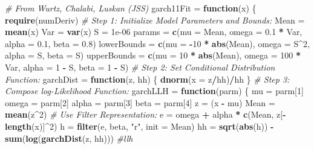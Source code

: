 \documentclass[]{book}
\newenvironment{Shaded}{\begin{snugshade}}{\end{snugshade}}
\newcommand{\KeywordTok}[1]{\textcolor[rgb]{0.13,0.29,0.53}{\textbf{#1}}}
\newcommand{\DataTypeTok}[1]{\textcolor[rgb]{0.13,0.29,0.53}{#1}}
\newcommand{\DecValTok}[1]{\textcolor[rgb]{0.00,0.00,0.81}{#1}}
\newcommand{\FloatTok}[1]{\textcolor[rgb]{0.00,0.00,0.81}{#1}}
\newcommand{\StringTok}[1]{\textcolor[rgb]{0.31,0.60,0.02}{#1}}
\newcommand{\CommentTok}[1]{\textcolor[rgb]{0.56,0.35,0.01}{\textit{#1}}}
\newcommand{\ControlFlowTok}[1]{\textcolor[rgb]{0.13,0.29,0.53}{\textbf{#1}}}
\newcommand{\OperatorTok}[1]{\textcolor[rgb]{0.81,0.36,0.00}{\textbf{#1}}}
\newcommand{\NormalTok}[1]{#1}
\begin{document}
\begin{Shaded}
\begin{Highlighting}[]
\CommentTok{# From Wurtz, Chalabi, Luskan (JSS)}
\NormalTok{garch11Fit =}\StringTok{ }\ControlFlowTok{function}\NormalTok{(x) \{}
    \KeywordTok{require}\NormalTok{(numDeriv)}
    \CommentTok{# Step 1: Initialize Model Parameters and Bounds:}
\NormalTok{    Mean =}\StringTok{ }\KeywordTok{mean}\NormalTok{(x)}
\NormalTok{    Var =}\StringTok{ }\KeywordTok{var}\NormalTok{(x)}
\NormalTok{    S =}\StringTok{ }\FloatTok{1e-06}
\NormalTok{    params =}\StringTok{ }\KeywordTok{c}\NormalTok{(}\DataTypeTok{mu =}\NormalTok{ Mean, }\DataTypeTok{omega =} \FloatTok{0.1} \OperatorTok{*}\StringTok{ }\NormalTok{Var, }\DataTypeTok{alpha =} \FloatTok{0.1}\NormalTok{, }\DataTypeTok{beta =} \FloatTok{0.8}\NormalTok{)}
\NormalTok{    lowerBounds =}\StringTok{ }\KeywordTok{c}\NormalTok{(}\DataTypeTok{mu =} \OperatorTok{-}\DecValTok{10} \OperatorTok{*}\StringTok{ }\KeywordTok{abs}\NormalTok{(Mean), }\DataTypeTok{omega =}\NormalTok{ S}\OperatorTok{^}\DecValTok{2}\NormalTok{, }\DataTypeTok{alpha =}\NormalTok{ S, }\DataTypeTok{beta =}\NormalTok{ S)}
\NormalTok{    upperBounds =}\StringTok{ }\KeywordTok{c}\NormalTok{(}\DataTypeTok{mu =} \DecValTok{10} \OperatorTok{*}\StringTok{ }\KeywordTok{abs}\NormalTok{(Mean), }\DataTypeTok{omega =} \DecValTok{100} \OperatorTok{*}\StringTok{ }\NormalTok{Var, }\DataTypeTok{alpha =} \DecValTok{1} \OperatorTok{-}\StringTok{ }\NormalTok{S, }\DataTypeTok{beta =} \DecValTok{1} \OperatorTok{-}\StringTok{ }
\StringTok{        }\NormalTok{S)}
    \CommentTok{# Step 2: Set Conditional Distribution Function:}
\NormalTok{    garchDist =}\StringTok{ }\ControlFlowTok{function}\NormalTok{(z, hh) \{}
        \KeywordTok{dnorm}\NormalTok{(}\DataTypeTok{x =}\NormalTok{ z}\OperatorTok{/}\NormalTok{hh)}\OperatorTok{/}\NormalTok{hh}
\NormalTok{    \}}
    \CommentTok{# Step 3: Compose log-Likelihood Function:}
\NormalTok{    garchLLH =}\StringTok{ }\ControlFlowTok{function}\NormalTok{(parm) \{}
\NormalTok{        mu =}\StringTok{ }\NormalTok{parm[}\DecValTok{1}\NormalTok{]}
\NormalTok{        omega =}\StringTok{ }\NormalTok{parm[}\DecValTok{2}\NormalTok{]}
\NormalTok{        alpha =}\StringTok{ }\NormalTok{parm[}\DecValTok{3}\NormalTok{]}
\NormalTok{        beta =}\StringTok{ }\NormalTok{parm[}\DecValTok{4}\NormalTok{]}
\NormalTok{        z =}\StringTok{ }\NormalTok{(x }\OperatorTok{-}\StringTok{ }\NormalTok{mu)}
\NormalTok{        Mean =}\StringTok{ }\KeywordTok{mean}\NormalTok{(z}\OperatorTok{^}\DecValTok{2}\NormalTok{)}
        \CommentTok{# Use Filter Representation:}
\NormalTok{        e =}\StringTok{ }\NormalTok{omega }\OperatorTok{+}\StringTok{ }\NormalTok{alpha }\OperatorTok{*}\StringTok{ }\KeywordTok{c}\NormalTok{(Mean, z[}\OperatorTok{-}\KeywordTok{length}\NormalTok{(x)]}\OperatorTok{^}\DecValTok{2}\NormalTok{)}
\NormalTok{        h =}\StringTok{ }\KeywordTok{filter}\NormalTok{(e, beta, }\StringTok{"r"}\NormalTok{, }\DataTypeTok{init =}\NormalTok{ Mean)}
\NormalTok{        hh =}\StringTok{ }\KeywordTok{sqrt}\NormalTok{(}\KeywordTok{abs}\NormalTok{(h))}
        \OperatorTok{-}\KeywordTok{sum}\NormalTok{(}\KeywordTok{log}\NormalTok{(}\KeywordTok{garchDist}\NormalTok{(z, hh)))  }\CommentTok{#llh}
        

\end{Highlighting}
\end{Shaded}
\end{document}
